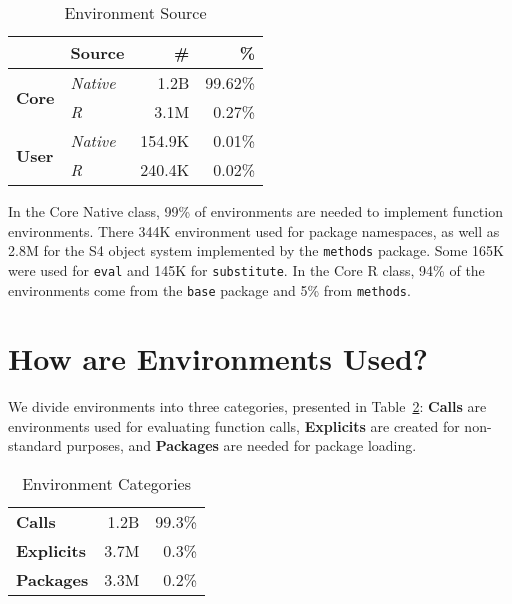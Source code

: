\documentclass[10pt,sigplan,authorversion=true]{acmart}
\renewcommand{\c}[1]{\lstinline |#1|\xspace}
\begin{document}
\begin{table}[!h]\small\centering
  \caption{Environment Source}\label{table:env_source}
  \begin{tabular}{llrr}\toprule
  &\textbf{Source}&\textbf{\#}&\textbf{\%}\\\midrule
\multirow{2}{*}{\textbf{Core}}&\multicolumn{1}{l}{\emph{Native}}&\multicolumn{1}{r}{1.2B}&\multicolumn{1}{r}{99.62\%}\\
                               & \multicolumn{1}{l}{\emph{R}}     & \multicolumn{1}{r}{3.1M} & \multicolumn{1}{r}{0.27\%}\\\midrule
\multirow{2}{*}{\textbf{User}}  & \multicolumn{1}{l}{\emph{Native}} & \multicolumn{1}{r}{154.9K} & \multicolumn{1}{r}{0.01\%}\\
                                & \multicolumn{1}{l}{\emph{R}}      & \multicolumn{1}{r}{240.4K} & \multicolumn{1}{r}{0.02\%}\\\bottomrule
  \end{tabular}
\end{table}

\noindent
In the Core Native class, 99\% of environments are needed to implement function
environments. There 344K environment used for package namespaces, as well as
2.8M for the S4 object system implemented by the \c{methods} package. Some 165K
were used for \c{eval} and 145K for \c{substitute}. In the Core R class, 94\% of
the environments come from the \c{base} package and 5\% from \c{methods}.


\section{How are Environments Used?}

We divide environments into three categories, presented in
Table~\ref{table:env_category}: \textbf{Calls} are environments used for
evaluating function calls, \textbf{Explicits} are created for non-standard
purposes, and \textbf{Packages} are needed for package loading.

\begin{table}[!h] \small
  \caption{Environment Categories} \label{table:env_category}\centering
  \begin{tabular}{lrr}\toprule
     \textbf{Calls}&     1.2B& 99.3\%\\
    \textbf{Explicits}& 3.7M& 0.3\%\\
    \textbf{Packages}&  3.3M& 0.2\%\\\bottomrule
  \end{tabular}
\end{table}
\end{document}
